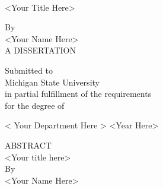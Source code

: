 \documentclass[12pt,letterpaper,twoside]{report}
\begin{document}
\sloppy
{}


\begin{titlepage}
\begin{center}
\ \\[1in]%
<Your Title Here>\\
\begin{doublespace}
By\\ %
<Your Name Here>\\[4.5 in]%
A DISSERTATION\\ %
\end{doublespace}

Submitted to \\ Michigan State University \\ in partial
fulfillment of the requirements \\ for the degree of\\
\begin{doublespace}
< Your Department Here >
<Year Here>\\
 \end{doublespace}
\end{center}
\end{titlepage}
\newpage


\thispagestyle{empty} \setcounter{page}{2}
\begin{doublespace}
\begin{centering}
ABSTRACT\\ %
<Your title here>\\ %
By \\ %
<Your Name Here>\\ %
\end{centering}



\end{doublespace}
\newpage

\end{document}
